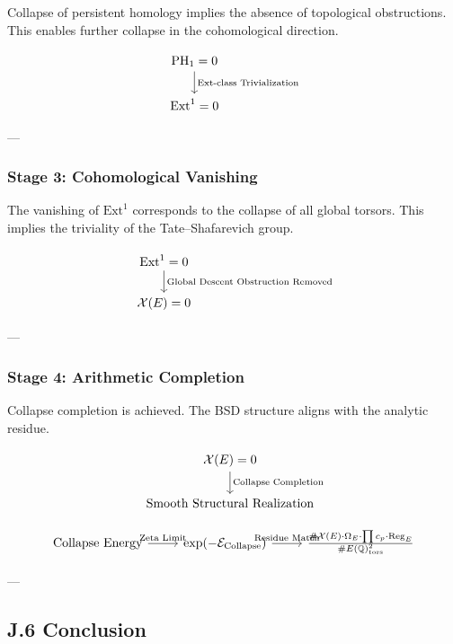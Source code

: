 \documentclass[11pt]{article}
\newcommand{\Sha}{\mathcal{X}}
\begin{document}
Collapse of persistent homology implies the absence of topological obstructions.
This enables further collapse in the cohomological direction.

\[
\begin{tikzcd}
\mathrm{PH}_1 = 0 \arrow[d, "\text{Ext-class Trivialization}"] \\
\mathrm{Ext}^1 = 0
\end{tikzcd}
\]

---

\subsubsection*{Stage 3: Cohomological Vanishing}

The vanishing of $\mathrm{Ext}^1$ corresponds to the collapse of all global torsors.
This implies the triviality of the Tate–Shafarevich group.

\[
\begin{tikzcd}
\mathrm{Ext}^1 = 0 \arrow[d, "\text{Global Descent Obstruction Removed}"] \\
\Sha(E) = 0
\end{tikzcd}
\]

---

\subsubsection*{Stage 4: Arithmetic Completion}

Collapse completion is achieved. The BSD structure aligns with the analytic residue.

\[
\begin{tikzcd}
\Sha(E) = 0 \arrow[d, "\text{Collapse Completion}"] \\
\text{Smooth Structural Realization}
\end{tikzcd}
\]




\vspace{1em}

\[
\begin{tikzcd}
\text{Collapse Energy} \arrow[r, "\text{Zeta Limit}"]
& \exp(-\mathcal{E}_{\text{Collapse}}) \arrow[r, "\text{Residue Match}"]
& \frac{\#\Sha(E) \cdot \Omega_E \cdot \prod c_p \cdot \operatorname{Reg}_E}{\# E(\mathbb{Q})_\text{tors}^2}
\end{tikzcd}
\]

---

\subsection*{J.6 Conclusion}
\end{document}
